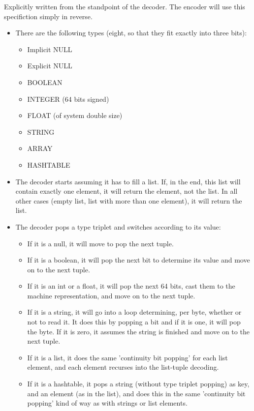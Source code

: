 Explicitly written from the standpoint of the decoder.
The encoder will use this specifiction simply in reverse.

\begin{itemize}
\item There are the following types (eight, so that they fit exactly
      into three bits):
  \begin{itemize}
  \item Implicit NULL
  \item Explicit NULL
  \item BOOLEAN
  \item INTEGER (64 bits signed)
  \item FLOAT (of system double size)
  \item STRING
  \item ARRAY
  \item HASHTABLE
  \end{itemize}

\item The decoder starts assuming it has to fill a list.
  If, in the end, this list will contain exactly one element, it will
  return the element, not the list. In all other cases (empty list,
  list with more than one element), it will return the list.

\item The decoder pops a type triplet and switches according to its value:
  \begin{itemize}
  \item If it is a null, it will move to pop the next tuple.
  \item If it is a boolean, it will pop the next bit to determine its value
        and move on to the next tuple.
  \item If it is an int or a float, it will pop the next 64 bits,
        cast them to the machine representation, and move on to the next tuple.
  \item If it is a string, it will go into a loop determining, per byte,
        whether or not to read it. It does this by popping a bit and if
        it is one, it will pop the byte. If it is zero, it assumes the
        string is finished and move on to the next tuple.
  \item If it is a list, it does the same 'continuity bit popping' for
        each list element, and each element recurses into the list-tuple
        decoding.
  \item If it is a hashtable, it pops a string (without type triplet popping)
        as key, and an element (as in the list), and does this in the same
        'continuity bit popping' kind of way as with strings or list elements.
  \end{itemize}


\end{itemize}
